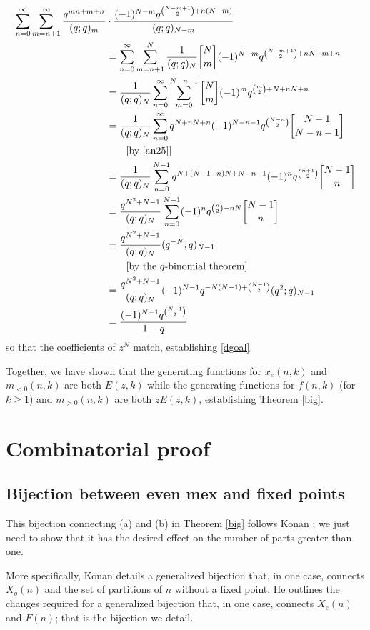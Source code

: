 \documentclass{amsart}
\theoremstyle{theorem}
\theoremstyle{definition}
\begin{document}
\begin{align*}
\sum_{n=0}^\infty \sum_{m=n+1}^\infty \frac{q^{mn+m+n}}{(q;q)_m} & \cdot \frac{(-1)^{N-m} q^{\binom{N-m+1}{2} + n(N-m)}}{(q;q)_{N-m}} \\
& = \sum_{n=0}^\infty \sum_{m=n+1}^N \frac{1}{(q;q)_N} {N \brack m} (-1)^{N-m} q^{\binom{N-m+1}{2} + nN+m+n} \\
& = \frac{1}{(q;q)_N} \sum_{n=0}^\infty \sum_{m=0}^{N-n-1} {N \brack m} (-1)^m q^{\binom{m}{2} + N+nN+n} \\
& = \frac{1}{(q;q)_N} \sum_{n=0}^\infty q^{N+nN+n} (-1)^{N-n-1} q^{\binom{N-n}{2}} {N-1 \brack N-n-1} \\
& \qquad \text{[by \cite[Lemma 3]{an25}]} \\
& = \frac{1}{(q;q)_N} \sum_{n=0}^{N-1} q^{N+(N-1-n)N + N -n-1} (-1)^n q^{\binom{n+1}{2}} {N-1 \brack n} \\
& = \frac{q^{N^2 + N - 1}}{(q;q)_N} \sum_{n=0}^{N-1} (-1)^n q^{\binom{n}{2}-nN} {N-1 \brack n} \\
& = \frac{q^{N^2 + N - 1}}{(q;q)_N} (q^{-N};q)_{N-1} \\
& \qquad \text{[by the $q$-binomial theorem]} \\
& = \frac{q^{N^2 + N - 1}}{(q;q)_N} (-1)^{N-1} q^{-N(N-1) + \binom{N-1}{2}} (q^2;q)_{N-1} \\
& = \frac{(-1)^{N-1} q^{\binom{N+1}{2}}}{1-q}
\end{align*}
so that the coefficients of $z^N$ match, establishing \eqref{dgoal}.

Together, we have shown that the generating functions for $x_e(n,k)$ and $m_{<0}(n,k)$ are both $E(z,k)$ while the generating functions for $f(n,k)$ (for $k \ge 1$) and $m_{>0}(n,k)$ are both $zE(z,k)$, establishing Theorem \ref{big}.

\section{Combinatorial proof}

\subsection{Bijection between even mex and fixed points}

This bijection connecting (a) and (b) in Theorem \ref{big} follows Konan \cite{k}; we just need to show that it has the desired effect on the number of parts greater than one.  

More specifically, Konan details a generalized bijection that, in one case, connects $X_o(n)$ and the set of partitions of $n$ without a fixed point.  He outlines the changes required for a generalized bijection that, in one case, connects $X_e(n)$ and $F(n)$; that is the bijection we detail.
\end{document}
